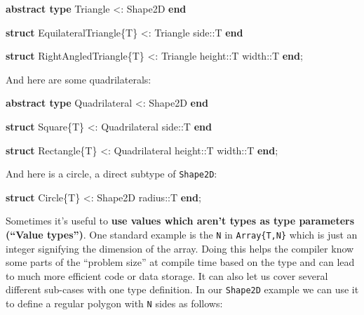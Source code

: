 \documentclass[
]{article}
\newenvironment{Shaded}{\begin{snugshade}}{\end{snugshade}}
\newcommand{\DataTypeTok}[1]{\textcolor[rgb]{0.68,0.00,0.00}{#1}}
\newcommand{\KeywordTok}[1]{\textcolor[rgb]{0.00,0.23,0.31}{\textbf{#1}}}
\newcommand{\NormalTok}[1]{\textcolor[rgb]{0.00,0.23,0.31}{#1}}
\newcommand{\OperatorTok}[1]{\textcolor[rgb]{0.37,0.37,0.37}{#1}}
\begin{document}
\begin{Shaded}
\begin{Highlighting}[]
\KeywordTok{abstract type}\NormalTok{ Triangle }\OperatorTok{\textless{}:}\DataTypeTok{ Shape2D}
\KeywordTok{end}

\KeywordTok{struct}\NormalTok{ EquilateralTriangle\{T\} }\OperatorTok{\textless{}:}\DataTypeTok{ Triangle}
\NormalTok{   side}\OperatorTok{::}\DataTypeTok{T}
\KeywordTok{end}

\KeywordTok{struct}\NormalTok{ RightAngledTriangle\{T\} }\OperatorTok{\textless{}:}\DataTypeTok{ Triangle}
\NormalTok{   height}\OperatorTok{::}\DataTypeTok{T}
\NormalTok{   width}\OperatorTok{::}\DataTypeTok{T}
\KeywordTok{end}\NormalTok{;}
\end{Highlighting}
\end{Shaded}

And here are some quadrilaterals:

\begin{Shaded}
\begin{Highlighting}[]
\KeywordTok{abstract type}\NormalTok{ Quadrilateral }\OperatorTok{\textless{}:}\DataTypeTok{ Shape2D}
\KeywordTok{end}

\KeywordTok{struct}\NormalTok{ Square\{T\} }\OperatorTok{\textless{}:}\DataTypeTok{ Quadrilateral}
\NormalTok{   side}\OperatorTok{::}\DataTypeTok{T}
\KeywordTok{end}

\KeywordTok{struct}\NormalTok{ Rectangle\{T\} }\OperatorTok{\textless{}:}\DataTypeTok{ Quadrilateral}
\NormalTok{   height}\OperatorTok{::}\DataTypeTok{T}
\NormalTok{   width}\OperatorTok{::}\DataTypeTok{T}
\KeywordTok{end}\NormalTok{;}
\end{Highlighting}
\end{Shaded}

And here is a circle, a direct subtype of \texttt{Shape2D}:

\begin{Shaded}
\begin{Highlighting}[]
\KeywordTok{struct}\NormalTok{ Circle\{T\} }\OperatorTok{\textless{}:}\DataTypeTok{ Shape2D}
\NormalTok{   radius}\OperatorTok{::}\DataTypeTok{T}
\KeywordTok{end}\NormalTok{;}
\end{Highlighting}
\end{Shaded}

Sometimes it's useful to \textbf{use values which aren't types as type
parameters (``Value types'')}. One standard example is the \texttt{N} in
\texttt{Array\{T,N\}} which is just an integer signifying the dimension
of the array. Doing this helps the compiler know some parts of the
``problem size'' at compile time based on the type and can lead to much
more efficient code or data storage. It can also let us cover several
different sub-cases with one type definition. In our \texttt{Shape2D}
example we can use it to define a regular polygon with \texttt{N} sides
as follows:
\end{document}
